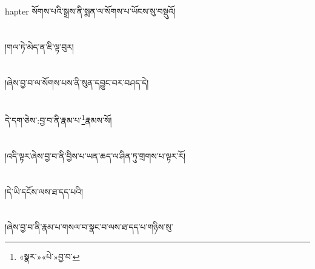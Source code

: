 hapter{ }སོགས་པའི་སྒྲས་ནི་སྨན་ལ་སོགས་པ་ཡོངས་སུ་བསྡུའོ།\chapter{ }།གལ་ཏེ་མེད་ན་ཇི་ལྟ་བུར།\chapter{ }།ཞེས་བྱ་བ་ལ་སོགས་པས་ནི་སུན་དབྱུང་བར་བཤད་དེ།\chapter{ }དེ་དག་ཅེས་:བྱ་བ་ནི་རྣམ་པ་\footnote{«སྣར་»«པེ་»བྱ་བ་}རྣམས་སོ།\chapter{ }།འདི་ལྟར་ཞེས་བྱ་བ་ནི་བྱིས་པ་ཡན་ཆད་ལ་ཤིན་ཏུ་གྲགས་པ་ལྟར་རོ།\chapter{ }།དེ་ཡི་དངོས་ལས་ཐ་དད་པའི།\chapter{ }།ཞེས་བྱ་བ་ནི་རྣམ་པ་གསལ་བ་སྣང་བ་ལས་ཐ་དད་པ་གཉིས་སུ་
